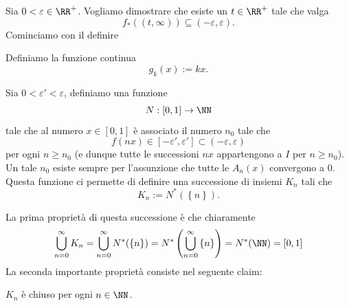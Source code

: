 \documentclass[11pt]{scrartcl}
\begin{document}
  	Sia $0<\varepsilon\in\RR^+$. Vogliamo dimostrare che esiste un $t\in \RR^+$ tale che valga $$f_*((t,\infty))\subseteq (-\varepsilon,\varepsilon).$$
  	Cominciamo con il definire
  	\begin{definition}
  		Definiamo la funzione continua
  		$$g_k(x):=kx.$$
  	\end{definition}
  	\begin{definition}
  		Sia $0<\varepsilon'<\varepsilon$, definiamo una funzione 
  		$$N:[0,1]\to \NN$$
  		tale che al numero $x\in[0,1]$ è associato il numero $n_0$ tale che 
  		$$f(nx)\in [-\varepsilon',\varepsilon']\subset (-\varepsilon,\varepsilon)$$
  		per ogni $n\ge n_0$ (e dunque tutte le successioni $nx$ appartengono a $I$ per $n\ge n_0$). Un tale $n_0$ esiste sempre per l'assunzione che tutte le $A_n(x)$ convergono a $0$. Questa funzione ci permette di definire una successione di insiemi $K_n$ tali che
  		$$K_n:=N^*(\left\{n\right\}).$$
  	\end{definition}
  	La prima proprietà di questa successione è che chiaramente 
  	$$\bigcup_{n=0}^\infty K_n=\bigcup_{n=0}^\infty N^*(\left\{n\right\})=N^*\left(\bigcup_{n=0}^\infty \left\{n\right\}\right)=N^*(\NN)=[0,1]$$
  	La seconda importante proprietà consiste nel seguente claim:
  	\begin{claim}
  		$K_n$ è chiuso per ogni $n\in\NN$.
  	\end{claim}
\end{document}
